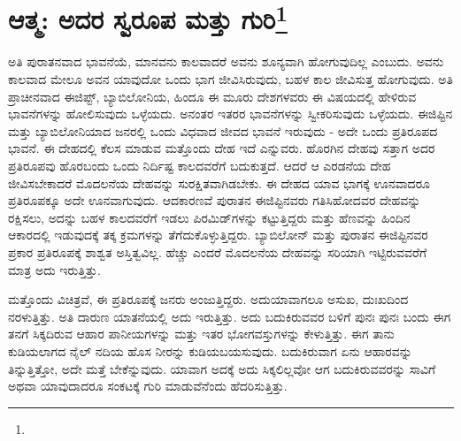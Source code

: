 
\chapter[ಆತ್ಮ: ಅದರ ಸ್ವರೂಪ ಮತ್ತು ಗುರಿ]{ಆತ್ಮ: ಅದರ ಸ್ವರೂಪ ಮತ್ತು ಗುರಿ\protect\footnote{}}

ಅತಿ ಪುರಾತನವಾದ ಭಾವನೆಯೆ, ಮಾನವನು ಕಾಲವಾದರೆ ಅವನು ಶೂನ್ಯವಾಗಿ ಹೋಗುವುದಿಲ್ಲ ಎಂಬುದು. ಅವನು ಕಾಲವಾದ ಮೇಲೂ ಅವನ ಯಾವುದೋ ಒಂದು ಭಾಗ ಜೀವಿಸಿರುವುದು, ಬಹಳ ಕಾಲ ಜೀವಿಸುತ್ತ ಹೋಗುವುದು. ಅತಿ ಪ್ರಾಚೀನವಾದ ಈಜಿಪ್ಟ್, ಬ್ಯಾಬಿಲೋನಿಯ, ಹಿಂದೂ ಈ ಮೂರು ದೇಶಗಳವರು ಈ ವಿಷಯದಲ್ಲಿ ಹೇಳಿರುವ ಭಾವನೆಗಳನ್ನು ಹೋಲಿಸುವುದು ಒಳ್ಳೆಯದು. ಅನಂತರ ಇತರರ ಭಾವನೆಗಳನ್ನು ಸ್ವೀಕರಿಸುವುದು ಒಳ್ಳೆಯದು. ಈಜಿಪ್ಟಿನ ಮತ್ತು ಬ್ಯಾಬಿಲೋನಿಯಾದ ಜನರಲ್ಲಿ ಒಂದು ವಿಧವಾದ ಜೀವದ ಭಾವನೆ ಇರುವುದು - ಅದೇ ಒಂದು ಪ್ರತಿರೂಪದ ಭಾವನೆ. ಈ ದೇಹದಲ್ಲಿ ಕೆಲಸ ಮಾಡುವ ಮತ್ತೊಂದು ದೇಹ ಇದೆ ಎನ್ನುವರು. ಹೊರಗಿನ ದೇಹವು ಸತ್ತಾಗ ಅದರ ಪ್ರತಿರೂಪವು ಹೊರಬಂದು ಒಂದು ನಿರ್ದಿಷ್ಟ ಕಾಲದವರೆಗೆ ಬದುಕುತ್ತದೆ. ಆದರೆ ಆ ಎರಡನೆಯ ದೇಹ ಜೀವಿಸಬೇಕಾದರೆ ಮೊದಲನೆಯ ದೇಹವನ್ನು ಸುರಕ್ಷಿತವಾಗಿಡಬೇಕು. ಈ ದೇಹದ ಯಾವ ಭಾಗಕ್ಕೆ ಊನವಾದರೂ ಪ್ರತಿರೂಪಕ್ಕೂ ಅದೇ ಊನವಾಗುವುದು. ಆದಕಾರಣವೆ ಪುರಾತನ ಈಜಿಪ್ಟಿನವರು ಗತಿಸಿಹೋದವರ ದೇಹವನ್ನು ರಕ್ಷಿಸಲು, ಅದನ್ನು ಬಹಳ ಕಾಲದವರೆಗೆ ಇಡಲು ಪಿರಮಿಡ್‌ಗಳನ್ನು ಕಟ್ಟುತ್ತಿದ್ದರು ಮತ್ತು ಹೆಣವನ್ನು ಹಿಂದಿನ ಆಕಾರದಲ್ಲಿ ಇಡುವುದಕ್ಕೆ ತಕ್ಕ ಕ್ರಮಗಳನ್ನು ತೆಗೆದುಕೊಳ್ಳುತ್ತಿದ್ದರು. ಬ್ಯಾಬಿಲೋನ್ ಮತ್ತು ಪುರಾತನ ಈಜಿಪ್ಟಿನವರ ಪ್ರಕಾರ ಪ್ರತಿರೂಪಕ್ಕೆ ಶಾಶ್ವತ ಅಸ್ತಿತ್ವವಿಲ್ಲ. ಹೆಚ್ಚು ಎಂದರೆ ಮೊದಲನೆಯ ದೇಹವನ್ನು ಸರಿಯಾಗಿ ಇಟ್ಟಿರುವವರೆಗೆ ಮಾತ್ರ ಅದು ಇರುತ್ತಿತ್ತು.

ಮತ್ತೊಂದು ವಿಚಿತ್ರವೆ, ಈ ಪ್ರತಿರೂಪಕ್ಕೆ ಜನರು ಅಂಜುತ್ತಿದ್ದರು. ಅದು\break ಯಾವಾಗಲೂ ಅಸುಖ, ದುಃಖದಿಂದ ನರಳುತ್ತಿತ್ತು. ಅತಿ ದಾರುಣ ಯಾತನೆಯಲ್ಲಿ ಅದು ಇರುತ್ತಿತ್ತು. ಅದು ಬದುಕಿರುವವರ ಬಳಿಗೆ ಪುನಃ ಪುನಃ ಬಂದು ಈಗ ತನಗೆ ಸಿಕ್ಕದಿರುವ ಆಹಾರ ಪಾನೀಯಗಳನ್ನು ಮತ್ತು ಇತರ ಭೋಗವಸ್ತುಗಳನ್ನು ಕೇಳುತ್ತಿತ್ತು. ಈಗ ತಾನು ಕುಡಿಯಲಾಗದ ನೈಲ್ ನದಿಯ ಹೊಸ ನೀರನ್ನು ಕುಡಿಯಬಯಸುವುದು. ಬದುಕಿರುವಾಗ ಏನು ಆಹಾರವನ್ನು ತಿನ್ನುತ್ತಿತ್ತೋ, ಅದೇ ಮತ್ತೆ ಬೇಕೆನ್ನುವುದು. ಯಾವಾಗ ಅದಕ್ಕೆ ಅದು ಸಿಕ್ಕಲಿಲ್ಲವೋ ಆಗ ಬದುಕಿರುವವರನ್ನು ಸಾವಿಗೆ ಅಥವಾ ಯಾವುದಾದರೂ ಸಂಕಟಕ್ಕೆ ಗುರಿ ಮಾಡುವೆನೆಂದು ಹೆದರಿಸುತ್ತಿತ್ತು.


